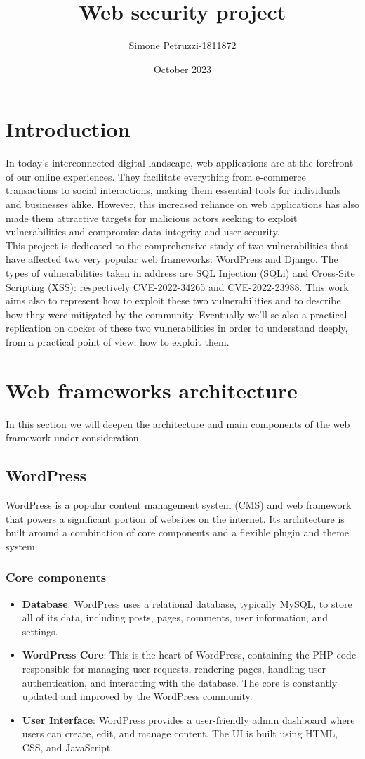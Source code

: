 \documentclass{article}
\title{Web security project}
\author{Simone Petruzzi-1811872}
\date{October 2023}
\begin{document}
   \maketitle
   \section{Introduction}
   In today's interconnected digital landscape, web applications are at the forefront of our online experiences. They facilitate everything from e-commerce transactions to social interactions, making them essential tools for individuals and businesses alike. However, this
increased reliance on web applications has also made them attractive targets for malicious actors seeking to exploit vulnerabilities and compromise data integrity and user security. \\

This project is dedicated to the comprehensive study of two vulnerabilities that have affected two very popular web frameworks: WordPress and Django. The types of vulnerabilities taken in address are SQL Injection (SQLi) and Cross-Site Scripting (XSS): respectively CVE-2022-34265 and CVE-2022-23988. This work aims also to represent how to exploit these two vulnerabilities and to describe how they were mitigated by the community. Eventually we'll se also a practical replication on docker of these two vulnerabilities in order to understand deeply, from a practical point of view, how to exploit them.

	\section{Web frameworks architecture}
	In this section we will deepen the architecture and main components of the web framework under consideration.
	\subsection{WordPress}
	WordPress is a popular content management system (CMS) and web framework that powers a significant portion of websites on the internet. Its architecture is built around a combination of core components and a flexible plugin and theme system. 
	\subsubsection{Core components}
	\begin{itemize}
		\item \textbf{Database}: WordPress uses a relational database, typically MySQL, to store all of its data, including posts, pages, comments, user information, and settings.
		\item \textbf{WordPress Core}: This is the heart of WordPress, containing the PHP code responsible for managing user requests, rendering pages, handling user authentication, and interacting with the database. The core is constantly updated and improved by the WordPress community.
		\item \textbf{User Interface}: WordPress provides a user-friendly admin dashboard where users can create, edit, and manage content. The UI is built using HTML, CSS, and JavaScript.
	\end{itemize}
\end{document}
